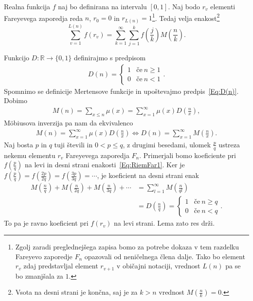 \documentclass[mat1]{fmfdelo}
\begin{document}
\begin{lema}
\label{Lema:RiemFar}
Realna funkcija $f$ naj bo definirana na intervalu $[0,1]$. Naj bodo $r_{v}$ elementi Fareyevega zaporedja reda $n$, $r_{0}=0$ in $r_{L(n)}=1$\footnote{Zgolj zaradi preglednejšega zapisa bomo za potrebe dokaza v tem razdelku Fareyevo zaporedje $F_{n}$ opazovali od neničelnega člena dalje. Tako bo element $r_{v}$ zdaj predstavljal element $r_{v+1}$ v običajni notaciji, vrednost $L(n)$ pa se bo zmanjšala za $1$.}. Tedaj velja enakost\footnote{Vsota na desni strani je končna, saj je za $k>n$ vrednost $M(\frac{n}{k})=0$.}
\begin{equation}
\label{Eq:RiemFar1}
	\sum_{v=1}^{L(n)} f(r_v) = \sum_{k=1}^{\infty} \sum_{j=1}^{k} f \left(\frac{j}{k} \right) M \left(\frac{n}{k} \right).
\end{equation}
\end{lema}

\begin{dokaz}
Funkcijo $D: \mathbb{R} \to \{0,1\}$ definirajmo s predpisom
\begin{align}
\label{Eq:D(n)}
D(n) = \left\{
\begin{array}{rl}
	1 & \textrm{če}\ n \geq 1 \\
	0 & \textrm{če}\ n < 1
\end{array}.
\right.
\end{align}
Spomnimo se definicije Mertensove funkcije in upoštevajmo predpis~\eqref{Eq:D(n)}. Dobimo
\begin{align*}
M(n) = \sum_{x \leq n} \mu(x) = \sum_{x=1}^{\infty} \mu(x) D \left( \frac{n}{x} \right),
\end{align*}
M\"obiusova inverzija pa nam da ekvivalenco
\begin{align*}
M(n) = \sum_{x=1}^{\infty} \mu(x) D \left( \frac{n}{x} \right) \Longleftrightarrow
D(n) = \sum_{x=1}^{\infty} M \left( \frac{n}{x} \right).
\end{align*}
Naj bosta $p$ in $q$ tuji števili in $0 < p \leq q$, z drugimi besedami, ulomek $\frac{p}{q}$ ustreza nekemu elementu $r_{v}$ Fareyevega zaporedja $F_{n}$.
Primerjali bomo koeficiente pri $f(\frac{p}{q})$ na levi in desni strani enakosti~\eqref{Eq:RiemFar1}.
Ker je $ f(\frac{p}{q}) = f(\frac{2p}{2q}) = f(\frac{3p}{3q}) = \cdots $, je koeficient na desni strani enak 
%
\begin{align*}
M \left(\frac{n}{q} \right) + M \left(\frac{n}{2q} \right) + M \left(\frac{n}{3q} \right) + \cdots &= \sum_{l=1}^{\infty} M \left(\frac{n}{ql} \right) \\
&= D \left(\frac{n}{q} \right) = \left\{
\begin{array}{rl}
	1 & \textrm{če}\ n \geq q \\
	0 & \textrm{če}\ n < q
\end{array}.
\right.
\end{align*}
%
To pa je ravno koeficient pri $f(r_{v})$ na levi strani. Lema zato res drži.
%
\end{dokaz}
\end{document}
